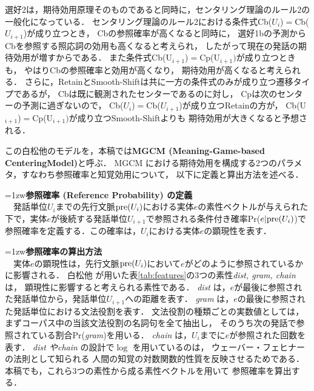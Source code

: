 \documentclass[japanese]{jnlp_1.3e}
\begin{document}
選好2は，期待効用原理そのものであると同時に，センタリング理論のルール2の一般化になっている．
センタリング理論のルール2における条件式Cb($U_i$)$=$Cb($U_{i+1}$)が成り立つとき，
Cbの参照確率が高くなると同時に，
選好1bの予測からCbを参照する照応詞の効用も高くなると考えられ，
したがって現在の発話の期待効用が増すからである．
また条件式Cb(U$_{i+1}$)$=$Cp(U$_{i+1})$が成り立つときも，
やはりCbの参照確率と効用が高くなり，
期待効用が高くなると考えられる．
さらに，RetainとSmooth-Shiftは共に一方の条件式のみが成り立つ遷移タイプであるが，
Cbは既に観測されたセンターであるのに対し，
Cpは次のセンターの予測に過ぎないので，
Cb($U_i$)$=$Cb($U_{i+1}$)が成り立つRetainの方が，
Cb(U$_{i+1}$)$=$Cp(U$_{i+1})$が成り立つSmooth-Shiftよりも
期待効用が大きくなると予想される．





この白松他\citeyear{siramatu2005nlp}のモデルを，本稿では{\bf MGCM (Meaning-Game-based Centering\linebreak Model)}と呼ぶ．
MGCM における期待効用を構成する2つのパラメタ，すなわち参照確率と知覚効用について，
以下に定義と算出方法を述べる．


    \noindent{}\hangindent=1zw\textbf{参照確率 (Reference Probability) の定義}\\
　発話単位$U_i$までの先行文脈${\rm pre}(U_i)$における実体$e$の素性ベクトルが与えられた下で，実体$e$が後続する発話単位$U_{i+1}$で参照される条件付き確率Pr($e|{\rm pre}(U_i)$)で参照確率を定義する．この確率は，$U_i$における実体$e$の顕現性を表す．

    \noindent{}\hangindent=1zw\textbf{参照確率の算出方法}\\
　実体$e$の顕現性は，先行文脈${\rm pre}(U_i)$において$e$がどのように参照されているかに影響される．
白松他 \citeyear{siramatu2005nlp} が用いた表\ref{tab:features}の3つの素性{\it dist, gram, chain}は，
顕現性に影響すると考えられる素性である．
{\it dist} は，$e$が最後に参照された発話単位から，発話単位$U_{i+1}$への距離を表す．
{\it gram} は，$e$の最後に参照された発話単位における文法役割を表す．
文法役割の種類ごとの実数値としては，
まずコーパス中の当該文法役割の名詞句を全て抽出し，
そのうち次の発話で参照されている割合Pr({\it gram})を用いる．
{\it chain} は，$U_i$までに$e$が参照された回数を表す．
{\it dist やchain }の設計で$\log$ を用いているのは，
ウェーバー・フェヒナーの法則として知られる
人間の知覚の対数関数的性質を反映させるためである．
本稿でも，これら3つの素性から成る素性ベクトルを用いて
参照確率を算出する．
\end{document}
